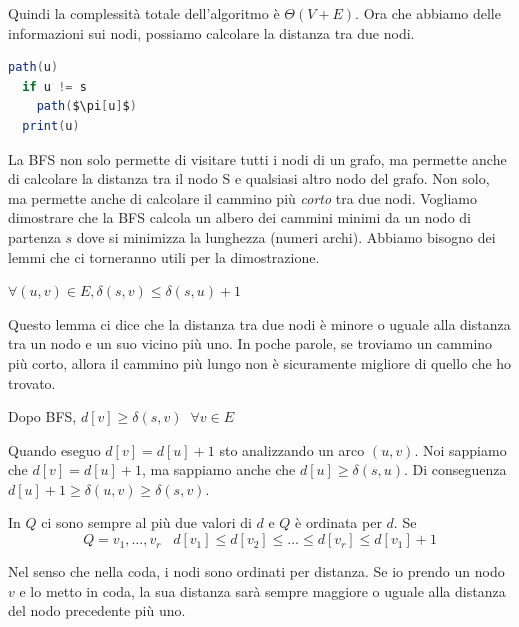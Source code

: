 \documentclass[a4paper]{article}
\begin{document}
Quindi la complessità totale dell'algoritmo è $\Theta(V + E)$. Ora che abbiamo
delle informazioni sui nodi, possiamo calcolare la distanza tra due nodi.
\begin{lstlisting}[language=Scala]
path(u)
  if u != s
    path($\pi[u]$)
  print(u)
\end{lstlisting}
La BFS non solo permette di visitare tutti i nodi di un grafo, ma permette anche di calcolare la distanza tra il nodo S e qualsiasi altro nodo del grafo.
Non solo, ma permette anche di calcolare il cammino più \textit{corto} tra due nodi.
Vogliamo dimostrare che la BFS calcola un albero dei cammini minimi da un nodo di partenza $s$ dove si minimizza la lunghezza (numeri archi).
Abbiamo bisogno dei lemmi che ci torneranno utili per la dimostrazione.
\begin{lemma}
$\forall (u,v) \in E, \delta(s,v) \le \delta(s,u) + 1$ 
\end{lemma}
Questo lemma ci dice che la distanza tra due nodi è minore o uguale alla distanza tra un nodo e un suo vicino più uno. In poche parole, se troviamo un cammino più corto, allora il cammino più lungo non è sicuramente migliore di quello che ho trovato.
\begin{lemma}
Dopo BFS, $d[v] \ge \delta(s,v) \; \; \forall v \in E$
\end{lemma}
Quando eseguo $d[v] = d[u] + 1$ sto analizzando un arco $(u,v)$. Noi sappiamo che $d[v] = d[u] + 1$, ma sappiamo anche che $d[u] \ge \delta(s,u)$. Di conseguenza $d[u] + 1 \ge \delta(u,v) \ge \delta(s,v)$.
\begin{lemma}
In $Q$ ci sono sempre al più due valori di $d$ e $Q$ è ordinata per $d$.
Se 
\[Q = v_1, \dots, v_r \; \; \; d[v_1] \le d[v_2] \le \dots \le d[v_r] \le d[v_1] + 1\]
\end{lemma}
Nel senso che nella coda, i nodi sono ordinati per distanza. Se io prendo un nodo $v$ e lo metto in coda, la sua distanza sarà sempre maggiore o uguale alla distanza del nodo precedente più uno.
\end{document}
